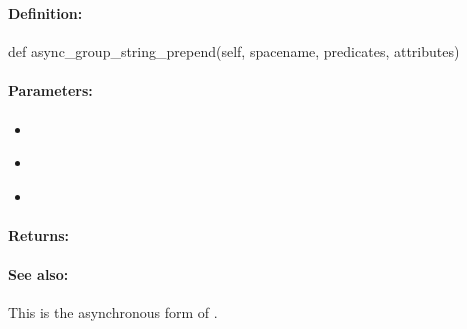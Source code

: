 \subsubsection{}
\label{api:python:async_group_string_prepend}


\paragraph{Definition:}
\begin{pythoncode}
def async_group_string_prepend(self, spacename, predicates, attributes)
\end{pythoncode}

\paragraph{Parameters:}
\begin{itemize}[noitemsep]
\item {}\\

\item {}\\

\item {}\\

\end{itemize}

\paragraph{Returns:}


\paragraph{See also:}  This is the asynchronous form of .

\pagebreak
\subsubsection{}
\label{api:python:string_append}


